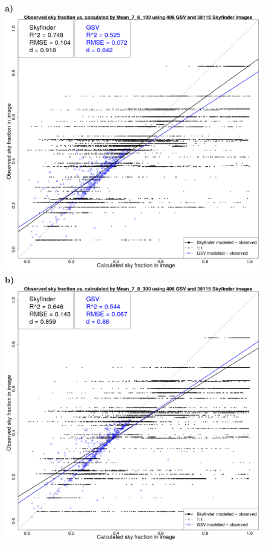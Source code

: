 \documentclass[final,3p,times,authoryear]{elsarticle}
\begin{document}
\begin{figure}
\centering
\textbf{a)}\includegraphics[scale=0.15]{Images/ErrorPlotsCombinedIndivMean_7_6_100.png} 
\textbf{b)}\includegraphics[scale=0.15]{Images/ErrorPlotsCombinedIndivMean_7_8_300.png}

\end{figure}
\end{document}

